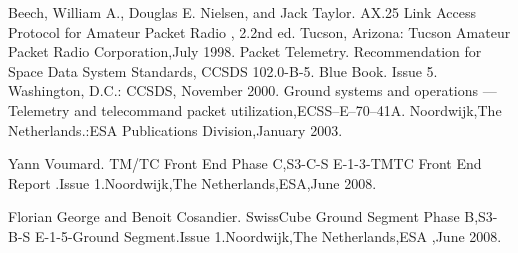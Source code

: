 \documentclass[BTech]{iitmdiss}
\begin{document}
\begin{thebibliography}{50}
 Beech, William A., Douglas E. Nielsen, and Jack Taylor. AX.25 Link Access Protocol for Amateur Packet Radio , 2.2nd ed. Tucson, Arizona: Tucson Amateur Packet Radio Corporation,July 1998.
Packet Telemetry. Recommendation for Space Data System Standards, CCSDS
102.0-B-5. Blue Book. Issue 5. Washington, D.C.: CCSDS, November 2000.
Ground systems and operations — Telemetry and telecommand packet utilization,ECSS--E--70--41A.
Noordwijk,The Netherlands.:ESA Publications Division,January 2003.

Yann Voumard. TM/TC Front End Phase C,S3-C-S E-1-3-TMTC Front End Report
.Issue 1.Noordwijk,The Netherlands,ESA,June 2008.


Florian George and Benoit Cosandier. SwissCube Ground Segment Phase B,S3-B-S E-1-5-Ground Segment.Issue 1.Noordwijk,The Netherlands,ESA ,June 2008.


\end{thebibliography}





%	

\end{document}
